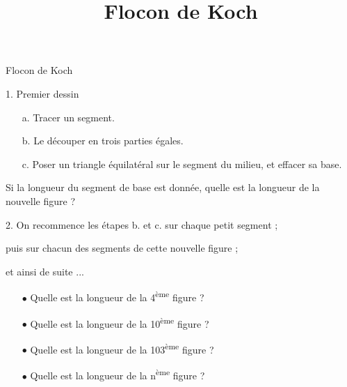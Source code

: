 \documentclass[a4paper,10pt]{beamer}
\title{Flocon de Koch}
\date{}
\author{}
\begin{document}
\begin{frame}
	\begin{center}
		{\LARGE Flocon de Koch}

		\vspace{1cm}

	\end{center}
\end{frame}

\begin{frame}
	\hspace{-2em} 1. Premier dessin
	\begin{tcolorbox}
		\begin{itemize}
			\item[a.] Tracer un segment.
			\item[b.] Le découper en trois parties égales.
			\item[c.] Poser un triangle équilatéral sur le segment du milieu, et effacer sa base.
		\end{itemize}
	\end{tcolorbox}
	Si la longueur du segment de base est donnée, quelle est la longueur de la nouvelle figure ?

	\vspace{0.5em}

	\hspace{-2em} 2. On recommence les étapes b. et c. sur chaque petit segment ;

	puis sur chacun des segments de cette nouvelle figure ;

	et ainsi de suite ...
	\begin{itemize}
		\item[$∙$] Quelle est la longueur de la 4\textsuperscript{ème} figure ?
		\item[$∙$] Quelle est la longueur de la 10\textsuperscript{ème} figure ?
		\item[$∙$] Quelle est la longueur de la 103\textsuperscript{ème} figure ?
		\item[$∙$] Quelle est la longueur de la n\textsuperscript{ème} figure ?
	\end{itemize}
\end{frame}
\end{document}
